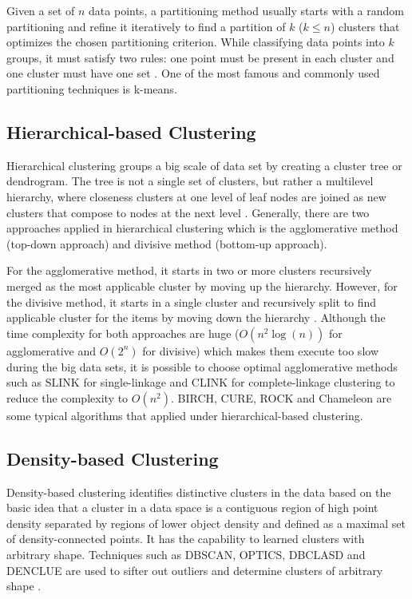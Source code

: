 \documentclass[sigconf]{acmart}
\begin{document}
Given a set of $n$ data points, a partitioning method usually starts with a random partitioning and refine it iteratively to find a partition of $k$ ($k \leq n$) clusters that optimizes the chosen partitioning criterion. While classifying data points into $k$ groups, it must satisfy two rules: one point must be present in each cluster and one cluster must have one set \cite{dcar}. One of the most famous and commonly used partitioning techniques is k-means.

\subsection{Hierarchical-based Clustering}

Hierarchical clustering groups a big scale of data set by creating a cluster tree or dendrogram. The tree is not a single set of clusters, but rather a multilevel hierarchy, where closeness clusters at one level of leaf nodes are joined as new clusters that compose to nodes at the next level \cite{math}. Generally, there are two approaches applied in hierarchical clustering which is the agglomerative method (top-down approach) and divisive method (bottom-up approach).

For the agglomerative method, it starts in two or more clusters recursively merged as the most applicable cluster by moving up the hierarchy. However, for the divisive method, it starts in a single cluster and recursively split to find applicable cluster for the items by moving down the hierarchy \cite{dcar}. Although the time complexity for both approaches are huge ($O(n^2\log(n))$ for agglomerative and $O(2^n)$ for divisive) which makes them execute too slow during the big data sets, it is possible to choose optimal agglomerative methods such as SLINK for single-linkage and CLINK for complete-linkage clustering to reduce the complexity to $O(n^2)$. BIRCH, CURE, ROCK and Chameleon are some typical algorithms that applied under hierarchical-based clustering.

\subsection{Density-based Clustering}

Density-based clustering identifies distinctive clusters in the data based on the basic idea that a cluster in a data space is a contiguous region of high point density separated by regions of lower object density \cite{jsdbc} and defined as a maximal set of density-connected points. It has the capability to learned clusters with arbitrary shape. Techniques such as DBSCAN, OPTICS, DBCLASD and DENCLUE are used to sifter out outliers and determine clusters of arbitrary shape \cite{dcar}.
\end{document}
